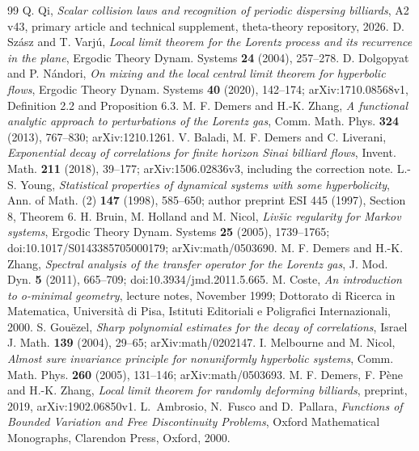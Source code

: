 \begin{thebibliography}{99}
 Q. Qi, \emph{Scalar collision laws and recognition of periodic dispersing billiards}, A2 v43, primary article and technical supplement, theta-theory repository, 2026.
 D. Sz\'asz and T. Varj\'u, \emph{Local limit theorem for the Lorentz process and its recurrence in the plane}, Ergodic Theory Dynam. Systems \textbf{24} (2004), 257--278.
 D. Dolgopyat and P. N\'andori, \emph{On mixing and the local central limit theorem for hyperbolic flows}, Ergodic Theory Dynam. Systems \textbf{40} (2020), 142--174; arXiv:1710.08568v1, Definition 2.2 and Proposition 6.3.
 M. F. Demers and H.-K. Zhang, \emph{A functional analytic approach to perturbations of the Lorentz gas}, Comm. Math. Phys. \textbf{324} (2013), 767--830; arXiv:1210.1261.
 V. Baladi, M. F. Demers and C. Liverani, \emph{Exponential decay of correlations for finite horizon Sinai billiard flows}, Invent. Math. \textbf{211} (2018), 39--177; arXiv:1506.02836v3, including the correction note.
 L.-S. Young, \emph{Statistical properties of dynamical systems with some hyperbolicity}, Ann. of Math. (2) \textbf{147} (1998), 585--650; author preprint ESI 445 (1997), Section 8, Theorem 6.
 H. Bruin, M. Holland and M. Nicol, \emph{Liv\v{s}ic regularity for Markov systems}, Ergodic Theory Dynam. Systems \textbf{25} (2005), 1739--1765; doi:10.1017/S0143385705000179; arXiv:math/0503690.
 M. F. Demers and H.-K. Zhang, \emph{Spectral analysis of the transfer operator for the Lorentz gas}, J. Mod. Dyn. \textbf{5} (2011), 665--709; doi:10.3934/jmd.2011.5.665.
 M. Coste, \emph{An introduction to o-minimal geometry}, lecture notes, November 1999; Dottorato di Ricerca in Matematica, Universit\`a di Pisa, Istituti Editoriali e Poligrafici Internazionali, 2000.
 S. Gou\"ezel, \emph{Sharp polynomial estimates for the decay of correlations}, Israel J. Math. \textbf{139} (2004), 29--65; arXiv:math/0202147.
 I. Melbourne and M. Nicol, \emph{Almost sure invariance principle for nonuniformly hyperbolic systems}, Comm. Math. Phys. \textbf{260} (2005), 131--146; arXiv:math/0503693.
 M. F. Demers, F. P\`ene and H.-K. Zhang, \emph{Local limit theorem for randomly deforming billiards}, preprint, 2019, arXiv:1902.06850v1.
L.~Ambrosio, N.~Fusco and D.~Pallara,
\emph{Functions of Bounded Variation and Free Discontinuity Problems},
Oxford Mathematical Monographs, Clarendon Press, Oxford, 2000.
\end{thebibliography}
